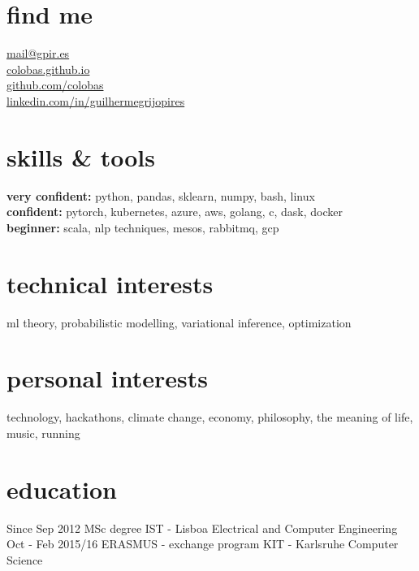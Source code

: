 \documentclass[]{colobas}
\begin{document}

\begin{minipage}[t]{0.3\textwidth}
\section{find me}
  \vspace{7pt}
  \href{mailto:mail@gpir.es}{mail@gpir.es}\\
  \href{https://colobas.github.io}{colobas.github.io}\\
  \href{https://github.com/colobas}{github.com/colobas}\\
  \href{https://linkedin.com/in/guilhermegrijopires/}{linkedin.com/in/guilhermegrijopires}%
\end{minipage}
\hfill
\begin{minipage}[t]{0.3\textwidth}
\section{skills \& tools}
  \vspace{7pt}
  \textbf{very confident:} python, pandas, sklearn, numpy, bash, linux\\
  \textbf{confident:} pytorch, kubernetes, azure, aws, golang, c, dask, docker\\
  \textbf{beginner:} scala, nlp techniques, mesos, rabbitmq, gcp%
\end{minipage}
\hfill
\begin{minipage}[t]{0.3\textwidth}
\section{technical interests}
  \vspace{7pt}
  ml theory, probabilistic modelling, variational inference, optimization%
  \vspace{15pt}
\section{personal interests}
  \vspace{7pt}
  technology, hackathons, climate change, economy, philosophy, the meaning of life,
  music, running
\end{minipage}

\vspace{0.5cm}

\section{education}
\entry
  {Since Sep 2012}
  {MSc degree}
  {IST - Lisboa}
  {Electrical and Computer Engineering}
\entry
  {Oct - Feb 2015/16}
  {ERASMUS - exchange program}
  {KIT - Karlsruhe}
  {Computer Science}
\end{document}
